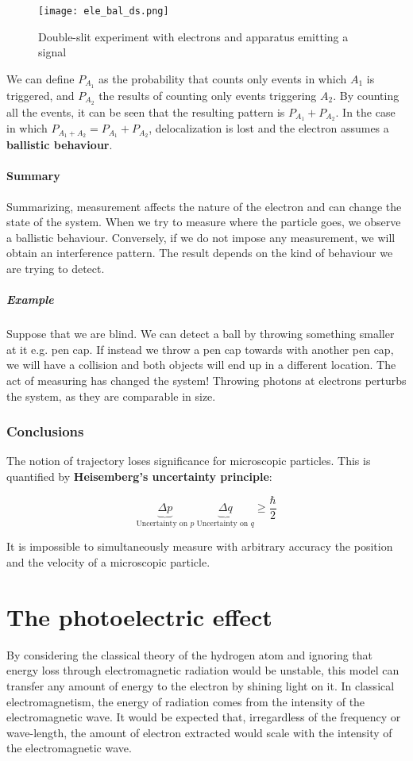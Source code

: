       \begin{figure}[h!]
        \centering
        \texttt{[image: ele\_bal\_ds.png]}
        \caption{\label{fig:ele_bal_ds} Double-slit experiment with electrons and apparatus emitting a signal}
      \end{figure}

      We can define $P_{A_1}$ as the probability that counts only events in which $A_1$ is triggered, and $P_{A_2}$ the results of counting only events triggering $A_2$.
      By counting all the events, it can be seen that the resulting pattern is $P_{A_1}+P_{A_2}$.
      In the case in which $P_{A_1+A_2} = P_{A_1} + P_{A_2}$, delocalization is lost and the electron assumes a \textbf{ballistic behaviour}.

      \paragraph{Summary}
      Summarizing, measurement affects the nature of the electron and can change the state of the system.
      When we try to measure where the particle goes, we observe a ballistic behaviour.
      Conversely, if we do not impose any measurement, we will obtain an interference pattern.
      The result depends on the kind of behaviour we are trying to detect.

        \subparagraph{Example}
        Suppose that we are blind. We can detect a ball by throwing something smaller at it e.g. pen cap.
        If instead we throw a pen cap towards with another pen cap, we will have a collision and both objects will end up in a different location.
        The act of measuring has changed the system!
        Throwing photons at electrons perturbs the system, as they are comparable in size.

    \subsubsection{Conclusions}
    The notion of trajectory loses significance for microscopic particles.
    This is quantified by \textbf{Heisemberg's uncertainty principle}:

    $$\underbrace{\Delta p}_{\text{Uncertainty on }p}\ \underbrace{\Delta q }_{\text{Uncertainty on }q} \ge \frac{\hbar}{2}$$

    It is impossible to simultaneously measure with arbitrary accuracy the position and the velocity of a microscopic particle.

\section{The photoelectric effect}
By considering the classical theory of the hydrogen atom and ignoring that energy loss through electromagnetic radiation would be unstable, this model can transfer any amount of energy to the electron by shining light on it.
In classical electromagnetism, the energy of radiation comes from the intensity of the electromagnetic wave.
It would be expected that, irregardless of the frequency or wave-length, the amount of electron extracted would scale with the intensity of the electromagnetic wave.

